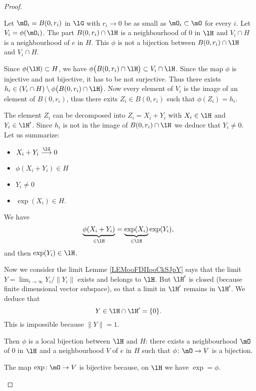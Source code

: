 \begin{proof}
\begin{subproof}
    Let \( \mO_i=B(0,r_i)\) in \( \lG\) with \( r_i\to 0\) be as small as \( \mO_i\subset \mO\) for every \( i\). Let \( V_i=\phi(\mO_i)\). The part \( B(0,r_i)\cap \lH\) is a neighbourhood of \( 0\) in \( \lH\) and \( V_i\cap H\) is a neighbourhood of \( e\) in \( H\). This \( \phi\) is not a bijection between \( B(0,r_i)\cap\lH\) and \( V_i\cap H\).

    Since \( \phi(\lH)\subset H\), we have \( \phi\big( B(0,r_i)\cap \lH \big)\subset V_i\cap \lH\). Since the map \( \phi\) is injective and not bijective, it has to be not surjective. Thus there exists \( h_i\in (V_i\cap H)\setminus\phi\big( B(0,r_i)\cap \lH \big)\). Now every element of \( V_i\) is the image of an element of \( B(0,r_i)\), thus there exits \( Z_i\in B(0,r_i)\) such that \( \phi(Z_i)=h_i\).

    The element \( Z_i\) can be decomposed into \( Z_i=X_i+Y_i\) with \( X_i\in \lH\) and \( Y_i\in \lH'\). Since \( h_i\) is not in the image of \( B(0,r_i)\cap\lH\) we deduce that \( Y_i\neq 0\). Let us summarize:
    \begin{itemize}
        \item \( X_i+Y_i\stackrel{\lG}{\longrightarrow}0\)
        \item
            \( \phi(X_i+Y_i)\in H\)
        \item
            \( Y_i\neq 0\)
        \item
            \( \exp(X_i)\in H\).
    \end{itemize}
    We have
    \begin{equation}
        \underbrace{\phi(X_i+Y_i)}_{\in \lH}=\underbrace{\exp(X_i)}_{\in \lH}\exp(Y_i),
    \end{equation}
    and then \( \exp(Y_i)\in\lH\).

    Now we consider the limit
    Lemme \ref{LEMooFDIIooCkSJpY} says that the limit \( Y=\lim_{i\to \infty} Y_i/\| Y_i \|\) exists and belongs to \( \lH\). But \( \lH'\) is closed (because finite dimensional vector subspace), so that a limit in \( \lH'\) remains in \( \lH'\). We deduce that
    \begin{equation}
        Y\in\lH\cap\lH'=\{ 0 \}.
    \end{equation}
    This is impossible because \( \| Y \|=1\).

    Then \( \phi\) is a local bijection between \( \lH\) and \( H\): there exists a neighbourhood \( \mO\) of \( 0\) in \( \lH\) and a neighbourhood \( V\) of \( e\) in \( H\) such that \( \phi\colon \mO\to V\) is a bijection.

    \spitem[Conclusion]
      
    The map \( \exp\colon \mO\to V\) is bijective because, on \( \lH\) we have \( \exp=\phi\).
    
    \end{subproof}
\end{proof}

